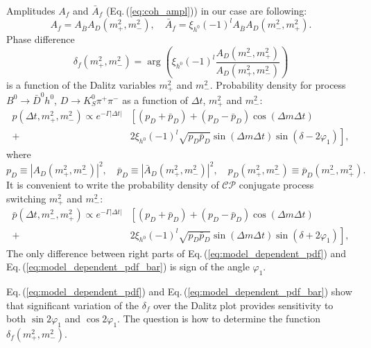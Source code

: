 \documentclass[preprint,aps,showpacs]{revtex4}
\newcommand{\dt}{\ensuremath{\Delta t}\xspace}
\newcommand{\mpsq}{\ensuremath{m_+^2}\xspace}
\newcommand{\mmsq}{\ensuremath{m_-^2}\xspace}
\newcommand{\cpconj}{\ensuremath{\mathcal{CP}}\xspace}
\newcommand{\dkpp}{\ensuremath{D\to K^0_S\pi^+\pi^-}\xspace}
\newcommand{\sindbeta}{\ensuremath{\sin{2\varphi_1}}\xspace}
\newcommand{\cosdbeta}{\ensuremath{\cos{2\varphi_1}}\xspace}
\newcommand{\bdh}{\ensuremath{B^0\to \bar D^0h^0}\xspace}
\begin{document}
Amplitudes $A_{f}$ and $\bar A_{f}$ (Eq.\,(\ref{eq:coh_ampl})) in our case are following:
\begin{equation}
 A_{f} = A_{\bar B} A_D(m^2_+,m^2_-),\quad \bar A_{f} = \xi_{h^0}(-1)^lA_{\bar B}A_D(m^2_-,m^2_+).
\end{equation}
Phase difference 
\begin{equation}
 \delta_f(m^2_+,m^2_-) = \arg\left(\xi_{h^0}(-1)^l\frac{A_D(m^2_-,m^2_+)}{A_D(m^2_+,m^2_-)}\right)
\end{equation}
is a function of the Dalitz variables $m^2_+$ and $m^2_-$. Probability density for process \bdh, \dkpp as a function of \dt, \mpsq and \mmsq:
\begin{equation}\label{eq:model_dependent_pdf}
\begin{split}
 p(\Delta t,\mpsq,\mmsq) \propto e^{-\Gamma|\dt|}&\left[\left(p_D+\bar p_D\right)+\left(p_D-\bar p_D\right)\cos(\Delta m\Delta t)\right.\\
 +&\left.2\xi_{h^0}(-1)^l\sqrt{p_D\bar p_D}\sin(\Delta m\Delta t)\sin{\left(\delta-2\varphi_1\right)}\right],
\end{split}
\end{equation}
where
\begin{equation}
 p_D \equiv \left|A_D(m^2_+,m^2_-)\right|^2,\quad \bar p_D \equiv \left|\bar A_D(m^2_+,m^2_-)\right|^2,\quad p_D(m^2_+,m^2_-)\equiv \bar p_D(m^2_-,m^2_+).
\end{equation}
It is convenient to write the probability density of \cpconj conjugate process switching \mpsq and \mmsq:
\begin{equation}\label{eq:model_dependent_pdf_bar}
\begin{split}
 \bar p(\Delta t,\mmsq,\mpsq) \propto e^{-\Gamma|\dt|}&\left[\left(p_D+\bar p_D\right)+\left(p_D-\bar p_D\right)\cos(\Delta m\Delta t)\right.\\
 +&\left.2\xi_{h^0}(-1)^l\sqrt{p_D\bar p_D}\sin(\Delta m\Delta t)\sin{\left(\delta+2\varphi_1\right)}\right],
\end{split}
\end{equation}
The only difference between right parts of Eq.\,(\ref{eq:model_dependent_pdf}) and Eq.\,(\ref{eq:model_dependent_pdf_bar}) is sign of the angle $\varphi_1$.

Eq.\,(\ref{eq:model_dependent_pdf}) and Eq.\,(\ref{eq:model_dependent_pdf_bar}) show that significant variation of the $\delta_f$ over the Dalitz plot provides sensitivity to both \sindbeta and \cosdbeta. The question is how to determine the function $\delta_f(m^2_+,m^2_-)$.
\end{document}
